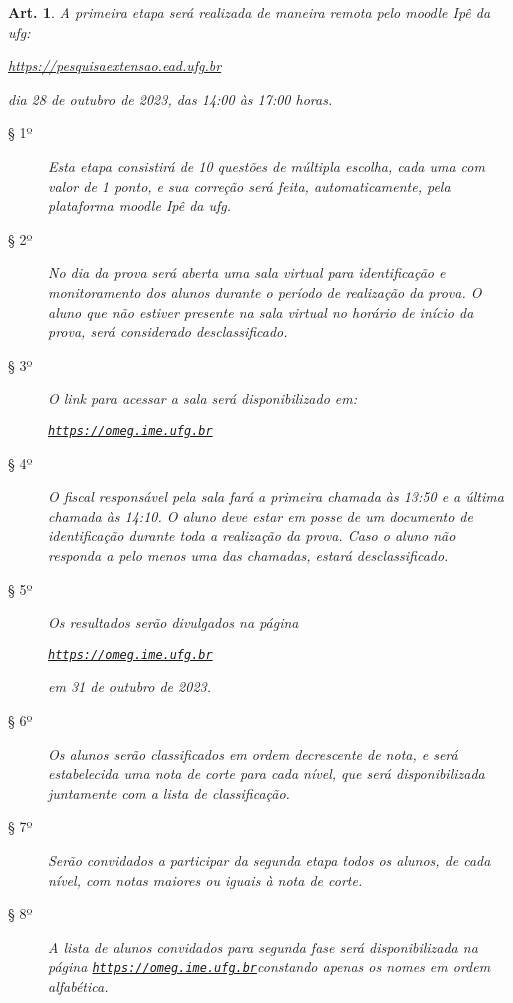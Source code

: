 \documentclass[a4paper,12pt]{article}
\newtheorem{article}{Art.}
\def\url{https://omeg.ime.ufg.br}
\def\homepage{\href{\url}{\texttt{\url}}}
\def\moodleufg{https://pesquisaextensao.ead.ufg.br}
\def\year{2023}
\def\phaseOne{28 de outubro de \year}
\def\resultsFromPhaseOne{31 de outubro de \year}
\begin{document}
\begin{article}
  A primeira etapa será realizada de maneira remota pelo \acrshort{moodle} Ipê
  da \acrshort{ufg}:
  \begin{center}
    \href{\moodleufg}{\moodleufg}
  \end{center}
  dia \phaseOne, das 14:00 às 17:00 horas.
  \begin{description}
    \item[§ 1º]
      Esta etapa consistirá de 10 questões de múltipla escolha, cada uma com
      valor de 1 ponto, e sua correção será feita, automaticamente, pela
      plataforma \acrshort{moodle} Ipê da \acrshort{ufg}.
    \item[§ 2º]
      No dia da prova será aberta uma sala virtual para identificação e
      monitoramento dos alunos durante o período de realização da prova. O
      aluno que não estiver presente na sala virtual no horário de início da
      prova, será considerado desclassificado.
    \item[§ 3º]
      O link para acessar a sala será disponibilizado em:
      \begin{center}
        \homepage
      \end{center}
    \item[§ 4º]
      O fiscal responsável pela sala fará a primeira chamada às 13:50 e a
      última chamada às 14:10. O aluno deve estar em posse de um documento de
      identificação durante toda a realização da prova. Caso o aluno não
      responda a pelo menos uma das chamadas, estará desclassificado.
    \item[§ 5º]
      Os resultados serão divulgados na página
      \begin{center}
        \homepage
      \end{center}
      em \resultsFromPhaseOne.
    \item[§ 6º]
      Os alunos serão classificados em ordem decrescente de nota, e será
      estabelecida uma nota de corte para cada nível, que será disponibilizada
      juntamente com a lista de classificação.
    \item[§ 7º]
      Serão convidados a participar da segunda etapa todos os alunos, de cada
      nível, com notas maiores ou iguais à nota de corte.
    \item[§ 8º]
      A lista de alunos convidados para segunda fase será disponibilizada na
      página \homepage constando apenas os nomes em ordem
      alfabética.
  \end{description}
\end{article}
\end{document}

